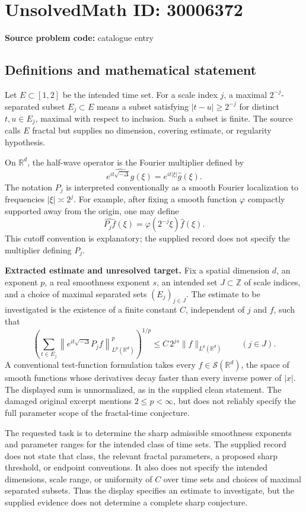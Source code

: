 \documentclass[11pt]{article}
\newcommand{\Z}{\mathbb{Z}}
\newcommand{\R}{\mathbb{R}}
\begin{document}
\section*{UnsolvedMath ID: 30006372}
\textbf{Source problem code:} catalogue entry
\subsection{Definitions and mathematical statement}
Let \(E\subset[1,2]\) be the intended time set. For a scale index \(j\), a maximal \(2^{-j}\)-separated subset \(E_j\subset E\) means a subset satisfying \(|t-u|\geq 2^{-j}\) for distinct \(t,u\in E_j\), maximal with respect to inclusion. Such a subset is finite. The source calls \(E\) fractal but supplies no dimension, covering estimate, or regularity hypothesis.

On \(\R^d\), the half-wave operator is the Fourier multiplier defined by
\[
\widehat{e^{it\sqrt{-\Delta}}g}(\xi)=e^{it|\xi|}\widehat g(\xi).
\]
The notation \(P_j\) is interpreted conventionally as a smooth Fourier localization to frequencies \(|\xi|\asymp 2^j\). For example, after fixing a smooth function \(\varphi\) compactly supported away from the origin, one may define
\[
\widehat{P_jf}(\xi)=\varphi(2^{-j}\xi)\widehat f(\xi).
\]
This cutoff convention is explanatory; the supplied record does not specify the multiplier defining \(P_j\).

\textbf{Extracted estimate and unresolved target.} Fix a spatial dimension \(d\), an exponent \(p\), a real smoothness exponent \(s\), an intended set \(J\subset\Z\) of scale indices, and a choice of maximal separated sets \((E_j)_{j\in J}\). The estimate to be investigated is the existence of a finite constant \(C\), independent of \(j\) and \(f\), such that
\[
\left(\sum_{t\in E_j}
\left\|e^{it\sqrt{-\Delta}}P_jf\right\|_{L^p(\R^d)}^p\right)^{1/p}
\leq C\,2^{js}\|f\|_{L^p(\R^d)}
\qquad(j\in J).
\]
A conventional test-function formulation takes every \(f\in\mathcal S(\R^d)\), the space of smooth functions whose derivatives decay faster than every inverse power of \(|x|\). The displayed sum is unnormalized, as in the supplied clean statement. The damaged original excerpt mentions \(2\leq p<\infty\), but does not reliably specify the full parameter scope of the fractal-time conjecture.

The requested task is to determine the sharp admissible smoothness exponents and parameter ranges for the intended class of time sets. The supplied record does not state that class, the relevant fractal parameters, a proposed sharp threshold, or endpoint conventions. It also does not specify the intended dimensions, scale range, or uniformity of \(C\) over time sets and choices of maximal separated subsets. Thus the display specifies an estimate to investigate, but the supplied evidence does not determine a complete sharp conjecture.
\end{document}
